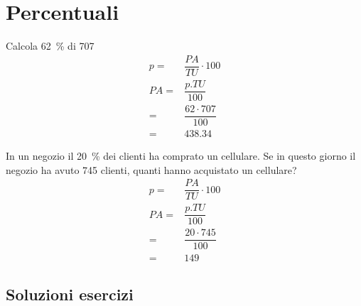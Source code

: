 \chapter{Percentuali}
\tcbstartrecording
\begin{exercise}
Calcola \SI{62}{\percent} di \num{707}
	\tcblower
\begin{align*}
	p=&\dfrac{PA}{TU}\cdot 100\\
	PA=&\dfrac{p. TU}{100}\\
=&\dfrac{62\cdot 707}{100}\\
=&\num{438.34}
\end{align*}
\end{exercise}
\begin{exercise}
	In un negozio il \SI{20}{\percent} dei clienti ha comprato un cellulare. Se in questo giorno il negozio ha avuto \num{745} clienti, quanti hanno acquistato un cellulare?
	\tcblower
	\begin{align*}
		p=&\dfrac{PA}{TU}\cdot 100\\
		PA=&\dfrac{p. TU}{100}\\
		=&\dfrac{20\cdot 745}{100}\\
		=&\num{149}
	\end{align*}
\end{exercise}
\tcbstoprecording
\newpage
\section{Soluzioni esercizi}
\tcbinputrecords